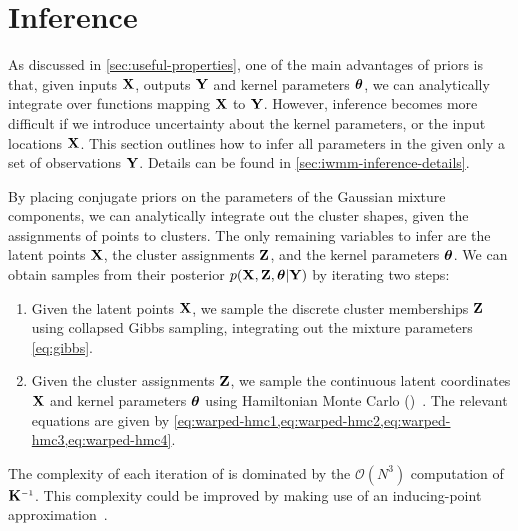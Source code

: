 \section{Inference}
\label{sec:iwmm-inference}

As discussed in \cref{sec:useful-properties}, one of the main advantages of \gp{} priors is that, given inputs $\mathbf{X}$, outputs $\mathbf{Y}$ and kernel parameters ${\boldsymbol{\theta}}$, we can analytically integrate over functions mapping $\mathbf{X}$ to $\mathbf{Y}$.
However, inference becomes more difficult if we introduce uncertainty about the kernel parameters, or the input locations $\mathbf{X}$.
This section outlines how to infer all parameters in the \iwmm{} given only a set of observations $\mathbf{Y}$.
Details can be found in \cref{sec:iwmm-inference-details}.

By placing conjugate priors on the parameters of the Gaussian mixture components, we can analytically integrate out the cluster shapes, given the assignments of points to clusters.
The only remaining variables to infer are the latent points $\mathbf{X}$, the cluster assignments $\mathbf{Z}$, and the kernel parameters ${\boldsymbol{\theta}}$.
%
%
We can obtain samples from their posterior 
$p(\mathbf{X},\mathbf{Z}, {\boldsymbol{\theta}} | \mathbf{Y})$ 
by iterating two steps:
\begin{enumerate}
\item
Given the latent points $\mathbf{X}$, we sample the discrete cluster memberships $\mathbf{Z}$ using collapsed Gibbs sampling, integrating out the mixture parameters \eqref{eq:gibbs}.
\item 
Given the cluster assignments $\mathbf{Z}$, we sample the continuous latent coordinates $\mathbf{X}$ and kernel parameters ${\boldsymbol{\theta}}$ using Hamiltonian Monte Carlo (\HMC{})~\citep[chapter 30]{mackay2003information}.
The relevant equations are given by \cref{eq:warped-hmc1,eq:warped-hmc2,eq:warped-hmc3,eq:warped-hmc4}.
\end{enumerate}

The complexity of each iteration of \HMC{} is dominated by the $\mathcal{O}(N^3)$ computation of $\vK\inv$.
This complexity could be improved by making use of an inducing-point approximation~\citep{quinonero2005unifying,snelson2006sparse}.



